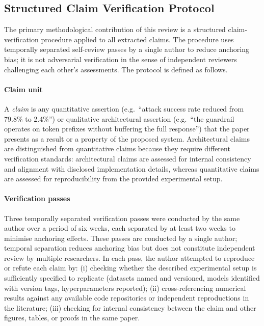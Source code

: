 \subsection{Structured Claim Verification Protocol}
\label{subsec:verification_protocol}

The primary methodological contribution of this review is a structured
claim-verification procedure applied to all extracted claims.
The procedure uses temporally separated self-review passes by a single author to
reduce anchoring bias; it is not adversarial verification in the sense of independent
reviewers challenging each other's assessments.
The protocol is defined as follows.

\paragraph{Claim unit}
A \emph{claim} is any quantitative assertion (e.g.\ ``attack success rate reduced
from 79.8\% to 2.4\%'') or qualitative architectural assertion (e.g.\ ``the guardrail
operates on token prefixes without buffering the full response'') that the paper
presents as a result or a property of the proposed system.
Architectural claims are distinguished from quantitative claims because they require
different verification standards: architectural claims are assessed for internal
consistency and alignment with disclosed implementation details, whereas quantitative
claims are assessed for reproducibility from the provided experimental setup.

\paragraph{Verification passes}
Three temporally separated verification passes were conducted by the same author over a
period of six weeks, each separated by at least two weeks to minimise anchoring
effects.
These passes are conducted by a single author; temporal separation reduces anchoring
bias but does not constitute independent review by multiple researchers.
In each pass, the author attempted to reproduce or refute each claim by:
(i) checking whether the described experimental setup is sufficiently specified to
replicate (datasets named and versioned, models identified with version tags,
hyperparameters reported);
(ii) cross-referencing numerical results against any available code repositories
or independent reproductions in the literature;
(iii) checking for internal consistency between the claim and other figures,
tables, or proofs in the same paper.

